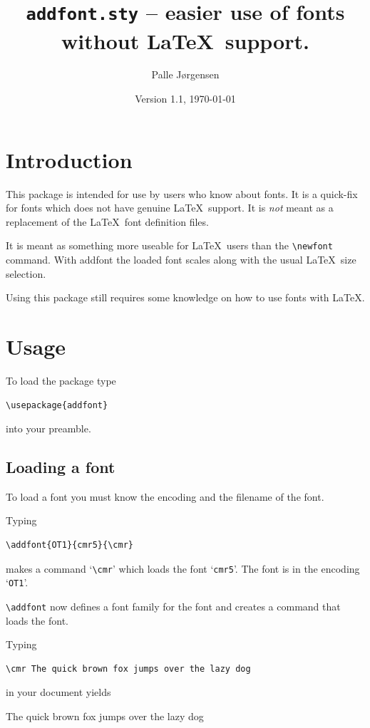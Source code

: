 \documentclass[12pt,british,parskip=half]{scrartcl}
\title{\texttt{addfont.sty} -- easier use of fonts without \LaTeX\
  support.} \author{Palle Jørgensen}
\date{Version 1.1, \today}
\begin{document}
\maketitle

\section{Introduction}
\label{sec:introduction}

This package is intended for use by users who know about fonts. It is
a quick-fix for fonts which does not have genuine \LaTeX\ support. It
is \emph{not} meant as a replacement of the \LaTeX\ font definition
files.

It is meant as something more useable for \LaTeX\ users than the
\lstinline+\newfont+ command. With addfont the loaded font scales
along with the usual \LaTeX\ size selection.

Using this package still requires some knowledge on how to use fonts
with \LaTeX.

\section{Usage}
\label{sec:usage}

To load the package type
\begin{lstlisting}
\usepackage{addfont}
\end{lstlisting}
into your preamble.

\subsection{Loading a font}
\label{sec:loading-font}

To load a font you must know the encoding and the filename of the font.

Typing
\begin{lstlisting}
\addfont{OT1}{cmr5}{\cmr}
\end{lstlisting}
makes a command `\lstinline|\cmr|' which loads the font
`\lstinline|cmr5|'. The font is in the encoding `\lstinline|OT1|'.

\lstinline|\addfont| now defines a font family for the font and creates
a command that loads the font.

Typing
\begin{lstlisting}[morekeywords=cmr]
\cmr The quick brown fox jumps over the lazy dog
\end{lstlisting}
in your document yields

{\cmr The quick brown fox jumps over the lazy dog}
\end{document}
